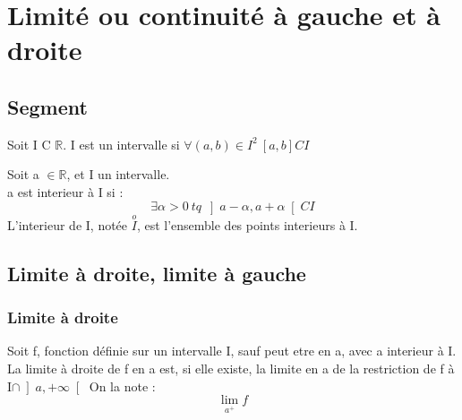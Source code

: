 \section{Limité ou continuité à gauche et à droite}
\subsection{Segment}
\begin{de}
Soit I C $\mathbb{R}$. I est un intervalle si $\forall (a,b) \in I^2~ \left[a,b \right] C I $\\
\end{de}
\begin{de}
Soit a $\in \mathbb{R}$, et I un intervalle.\\
a est interieur à I si : 
$$\exists \alpha > 0~ tq~ \left]a-\alpha,a+\alpha \right[ C I$$
L'interieur de I, notée $\overset{o}I$, est l'ensemble des points interieurs à I.
\end{de}
\subsection{Limite à droite, limite à gauche}
\subsubsection{Limite à droite}
\begin{de}
Soit f, fonction définie sur un intervalle I, sauf peut etre en a, avec a interieur à I.\\
La limite à droite de f en a est, si elle existe, la limite en a de la restriction de f à I$\cap \left]a,+\infty \right[$
On la note : 
$$\lim_{a^+} f$$
\end{de}
